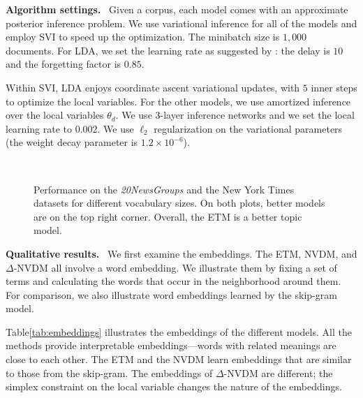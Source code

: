 \documentclass[11pt,a4paper]{article}
\DeclareRobustCommand{\parhead}[1]{\noindent\textbf{#1}~}
\begin{document}
\parhead{Algorithm settings.}  Given a corpus, each model comes with an
approximate posterior inference problem.  We use variational inference
for all of the models and employ \gls{SVI} \citep{Hoffman2013} to
speed up the optimization. The minibatch size is $1{,}000$ documents.
For \gls{LDA}, we set the learning rate as suggested by \citet{Hoffman2013}: the
delay is $10$ and the forgetting factor is $0.85$.

Within \gls{SVI}, \gls{LDA} enjoys coordinate ascent variational
updates, with $5$ inner steps to optimize the local variables.  For
the other models, we use amortized inference over the local variables
$\theta_d$.  We use $3$-layer inference networks and we set the local
learning rate to $0.002$. We use $\ell_2$ regularization on the
variational parameters (the weight decay parameter is
$1.2\times 10^{-6}$).


\begin{figure*}[t]
  \centering
   \\
  \caption{Performance on the \emph{20NewsGroups} and the New York
    Times datasets for different vocabulary sizes. On both plots,
    better models are on the top right corner. Overall, the \gls{ETM}
    is a better topic model.}
  \label{fig:scatter}
\end{figure*}

\parhead{Qualitative results.}  We first examine the embeddings.  The
\gls{ETM}, \gls{NVDM}, and $\Delta$-\gls{NVDM} all involve a word
embedding.  We illustrate them by fixing a set of terms and
calculating the words that occur in the neighborhood around them.  For
comparison, we also illustrate word embeddings learned by the
skip-gram model.

Table\nobreakspace \ref {tab:embeddings} illustrates the embeddings of the different
models.  All the methods provide interpretable embeddings---words with
related meanings are close to each other. The \gls{ETM} and the
\gls{NVDM} learn embeddings that are similar to those from the
skip-gram.  The embeddings of $\Delta$-\gls{NVDM} are different; the
simplex constraint on the local variable changes the nature of the
embeddings.
\end{document}
